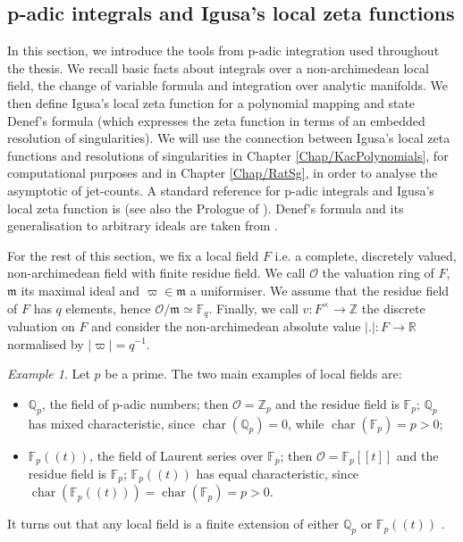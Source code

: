 \documentclass[11pt,english]{article}
\numberwithin{equation}{section}
\numberwithin{figure}{section}
\theoremstyle{definition}
\theoremstyle{plain}
\theoremstyle{remark}
\newtheorem{exmp}[df]{Example}
\DeclareMathOperator{\ch}{char}
\newcommand\ZZ{\mathbb{Z}}
\newcommand\FF{\mathbb{F}}
\begin{document}
\subsection{p-adic integrals and Igusa's local zeta functions \label{Subsect/p-adic}}

In this section, we introduce the tools from p-adic integration used
throughout the thesis. We recall basic facts about integrals over
a non-archimedean local field, the change of variable formula and
integration over analytic manifolds. We then define Igusa's local
zeta function for a polynomial mapping and state Denef's formula (which
expresses the zeta function in terms of an embedded resolution of
singularities). We will use the connection between Igusa's local zeta
functions and resolutions of singularities in Chapter \ref{Chap/KacPolynomials},
for computational purposes and in Chapter \ref{Chap/RatSg}, in order
to analyse the asymptotic of jet-counts. A standard reference for
p-adic integrals and Igusa's local zeta function is \cite{Igu00}
(see also the Prologue of \cite{CLNS18}). Denef's formula and its
generalisation to arbitrary ideals are taken from \cite{Den87,VZG08}.

For the rest of this section, we fix a local field $F$ i.e. a complete,
discretely valued, non-archimedean field with finite residue field.
We call $\mathcal{O}$ the valuation ring of $F$, $\mathfrak{m}$
its maximal ideal and $\varpi\in\mathfrak{m}$ a uniformiser. We assume
that the residue field of $F$ has $q$ elements, hence $\mathcal{O}/\mathfrak{m}\simeq\FF_{q}$.
Finally, we call $v:F^{\times}\rightarrow\ZZ$ the discrete valuation
on $F$ and consider the non-archimedean absolute value $\vert.\vert:F\rightarrow\mathbb{R}$
normalised by $\vert\varpi\vert=q^{-1}$.

\begin{exmp}

Let $p$ be a prime. The two main examples of local fields are:
\begin{itemize}
\item $\mathbb{Q}_{p}$, the field of p-adic numbers; then $\mathcal{O}=\ZZ_{p}$
and the residue field is $\FF_{p}$; $\mathbb{Q}_{p}$ has mixed characteristic,
since $\ch(\mathbb{Q}_{p})=0$, while $\ch(\FF_{p})=p>0$;
\item $\FF_{p}((t))$, the field of Laurent series over $\FF_{p}$; then
$\mathcal{O}=\FF_{p}[[t]]$ and the residue field is $\FF_{p}$; $\FF_{p}((t))$
has equal characteristic, since $\ch(\FF_{p}((t)))=\ch(\FF_{p})=p>0$.
\end{itemize}
It turns out that any local field is a finite extension of either
$\mathbb{Q}_{p}$ or $\FF_{p}((t))$ \cite[Prop. II.5.2.]{Neu99}.

\end{exmp}
\end{document}
